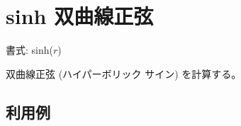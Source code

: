 
%

\section{sinh 双曲線正弦\label{sect:sinh}}

書式: sinh($r$)

双曲線正弦 (ハイパーボリック サイン) を計算する。

\subsection*{利用例}


%

